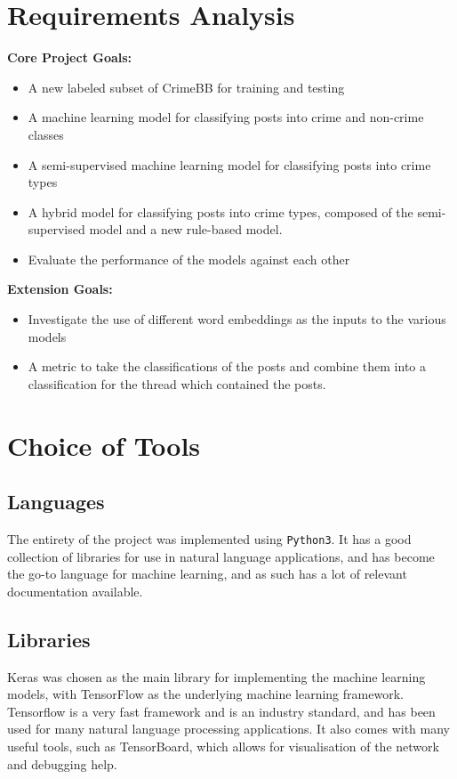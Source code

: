 \documentclass[12pt,a4paper,twoside,openright]{report}
\begin{document}
\section{Requirements Analysis}
\label{section:goals}
\textbf{Core Project Goals:}
\begin{itemize}
    \item A new labeled subset of CrimeBB for training and testing
    \item A machine learning model for classifying posts into crime and non-crime classes
    \item A semi-supervised machine learning model for classifying posts into crime types
    \item A hybrid model for classifying posts into crime types, composed of the semi-supervised model and a new rule-based model. 
    \item Evaluate the performance of the models against each other
\end{itemize}
\textbf{Extension Goals:}
\begin{itemize}
    \item Investigate the use of different word embeddings as the inputs to the various models
    \item A metric to take the classifications of the posts and combine them into a classification for the thread which contained the posts. 
\end{itemize}


\section{Choice of Tools}
\subsection{Languages}
The entirety of the project was implemented using \texttt{Python3}. It has a good collection of libraries for use in natural language applications, and has become the go-to language for machine learning, and as such has a lot of relevant documentation available.

\subsection{Libraries}
Keras was chosen as the main library for implementing the machine learning models, with TensorFlow as the underlying machine learning framework. Tensorflow is a very fast framework and is an industry standard, and has been used for many natural language processing applications. It also comes with many useful tools, such as TensorBoard, which allows for visualisation of the network and debugging help. 
\end{document}
